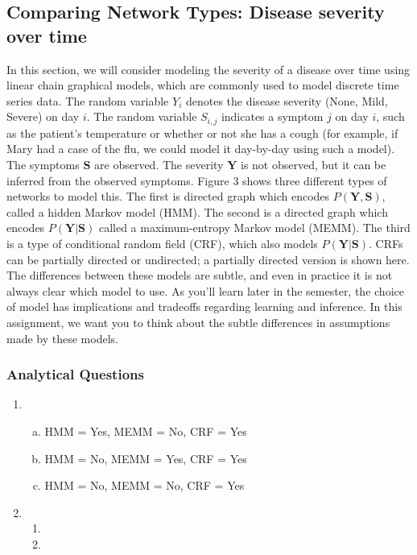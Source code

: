 \documentclass[12pt]{article}
\begin{document}
\subsection{Comparing Network Types: Disease severity over time}
In this section, we will consider modeling the severity of a disease over time using linear chain graphical models, which are commonly used to model discrete time series data.
The random variable $Y_i$ denotes the disease severity (None, Mild, Severe) on day $i$. The random variable $S_{i,j}$ indicates a symptom $j$ on day $i$, such as the patient’s temperature or whether or not she has a cough (for example, if Mary had a case of the flu, we could model it day-by-day using such a model). The symptoms $\mathbf{S}$ are observed. The severity $\mathbf{Y}$ is not observed, but it can be inferred from the observed symptoms.
Figure 3 shows three different types of networks to model this. The first is directed graph which encodes $P(\mathbf{Y}, \mathbf{S})$, called a hidden Markov model (HMM). The second is a directed graph which encodes $P(\mathbf{Y}|\mathbf{S})$ called a maximum-entropy Markov model (MEMM). The third is a type of conditional random field (CRF), which also models $P(\mathbf{Y}|\mathbf{S})$. CRFs can be partially directed or undirected; a partially directed version is shown here.
The differences between these models are subtle, and even in practice it is not always clear which model to use. As you’ll learn later in the semester, the choice of model has implications and tradeoffs regarding learning and inference. In this assignment, we want you to think about the subtle differences in assumptions made by these models.
\subsubsection{Analytical Questions}

\begin{enumerate}[1.]
	\item 
		\begin{enumerate}[(a)]
			\item HMM = Yes, MEMM = No, CRF = Yes
			\item HMM = No, MEMM = Yes, CRF = Yes
			\item HMM = No, MEMM = No, CRF = Yes
		\end{enumerate}
		
	\item \begin{enumerate}
		\item
			
		\item 
	\end{enumerate}
\end{enumerate}
\end{document}
